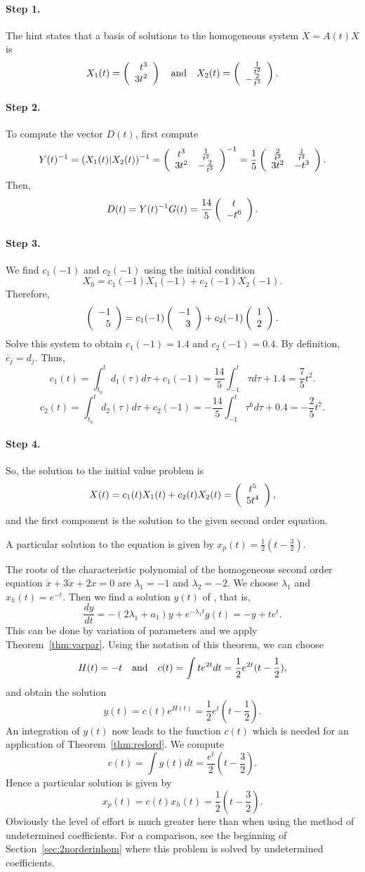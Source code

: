 \paragraph{Step 1.} The hint states that
a basis of solutions to the homogeneous system
$\dot{X} = A(t)X$ is
\[
X_1(t) = \left(\begin{array}{r} t^3 \\ 3t^2\end{array}\right) \quad\mbox{and}\quad X_2(t) =
\left(\begin{array}{r} \frac{1}{t^2} \\ -\frac{2}{t^3}\end{array}\right).
\]
\paragraph{Step 2.} To compute the vector $D(t)$, first compute
\[
Y(t)^{-1} = (X_1(t)|X_2(t))^{-1} =
\left(\begin{array}{cc} t^3 & \frac{1}{t^2}\\ 3t^2 &-\frac{2}{t^3}\end{array}\right)^{-1} =
\frac{1}{5}\left(\begin{array}{cc} \frac{2}{t^3} & \frac{1}{t^2}\\ 3t^2 &-t^3\end{array}\right).
\]
Then,
\[
D(t) = Y(t)^{-1}G(t) =
\frac{14}{5}\left(\begin{array}{c} t \\ -t^6\end{array}\right).
\]
\paragraph{Step 3.} We find $c_1(-1)$ and $c_2(-1)$ using the initial
condition
\[
X_0 = c_1(-1)X_1(-1) + c_2(-1)X_2(-1).
\]
Therefore,
\[
\left(\begin{array}{r} -1 \\ 5\end{array}\right) = c_1(-1)\left(\begin{array}{r} -1 \\ 3\end{array}\right) + c_2(-1)\left(\begin{array}{r} 1 \\ 2\end{array}\right).
\]
Solve this system to obtain $c_1(-1) = 1.4$ and $c_2(-1) = 0.4$.  By
definition,
$\dot{c_j} = d_j$.  Thus,
\[
c_1(t) = \int_{t_0}^td_1(\tau)d\tau + c_1(-1)
= \frac{14}{5}\int_{-1}^t\tau d\tau + 1.4 = \frac{7}{5}t^2.
\]
\[
c_2(t) = \int_{t_0}^td_2(\tau)d\tau + c_2(-1)
= -\frac{14}{5}\int_{-1}^t\tau^6 d\tau + 0.4= -\frac{2}{5}t^7.
\]
\paragraph{Step 4.} So, the solution to the initial value problem is
\[
X(t) = c_1(t)X_1(t) + c_2(t)X_2(t) = \left(\begin{array}{c} t^5 \\ 5t^4\end{array}\right),
\]
and the first component is the solution to the given second order
equation.

 \ans A particular solution to the equation is given by
$x_p(t) = \frac{1}{2}(t-\frac{3}{2})$.

\soln The roots of the characteristic polynomial of the homogeneous
second order equation $\ddot x + 3\dot x + 2x = 0$
are $\lambda_1 = -1 $ and $\lambda_2 = -2$.
We choose $\lambda_1$ and $x_h(t)=e^{-t}$.  Then we find a solution
$y(t)$ of , that is,
\[
\frac{dy}{dt} = -(2\lambda_1 +a_1) y + e^{-\lambda_1 t}g(t) =
-y + te^t.
\]
This can be done by variation of parameters and we apply
Theorem~\ref{thm:varpar}.  Using the notation of this theorem, we can
choose
\[
H(t) = -t \quad\mbox{and}\quad c(t) = \int t e^{2t} dt = \frac{1}{2}e^{2t}(t-\frac{1}{2}),
\]
and obtain the solution
\[
y(t) = c(t)e^{H(t)} = \frac{1}{2}e^{t}(t-\frac{1}{2}).
\]
An integration of $y(t)$ now leads to the function $c(t)$ which is needed
for an application of Theorem~\ref{thm:redord}.  We compute
\[
c(t) = \int y(t)dt = \frac{e^t}{2}(t-\frac{3}{2}).
\]
Hence a particular solution is given by
\[
x_p(t) = c(t) x_h(t) =  \frac{1}{2}(t-\frac{3}{2}).
\]
Obviously the level of effort is much greater here than when using the method
of undetermined coefficients.  For a comparison, see the
beginning of Section~\ref{sec:2norderinhom} where
this problem is solved by undetermined coefficients.

